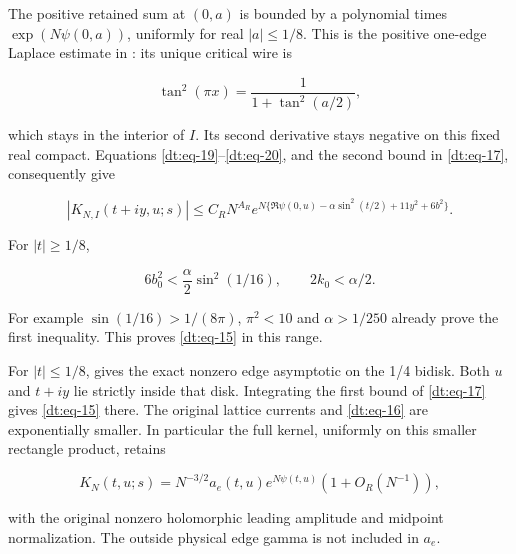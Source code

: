 The positive retained sum at \((0,a)\) is bounded by a polynomial times
\(\exp(N\psi(0,a))\), uniformly for real \(|a|\le1/8\). This is the positive one-edge Laplace estimate in \cite[Section~3]{Summed}: its unique critical wire is

\begin{equation}\label{dt:eq-21}
\tan^2(\pi x)=\frac1{1+\tan^2(a/2)},
\end{equation}

which stays in the interior of \(I\). Its second derivative stays negative
on this fixed real compact. Equations \eqref{dt:eq-19}--\eqref{dt:eq-20}, and the second bound
in \eqref{dt:eq-17}, consequently give

\begin{equation}\label{dt:eq-22}
|K_{N,I}(t+iy,u;s)|\le C_RN^{A_R}
 e^{N\{\Re\psi(0,u)-\alpha\sin^2(t/2)+11y^2+6b^2\}}.
\end{equation}

For \(|t|\ge1/8\),

\begin{equation}\label{dt:eq-23}
6b_0^2<\frac{\alpha}{2}\sin^2(1/16),\qquad
                         2k_0<\alpha/2.
\end{equation}

For example \(\sin(1/16)>1/(8\pi)\), \(\pi^2<10\) and \(\alpha>1/250\) already
prove the first inequality. This proves \eqref{dt:eq-15} in this range.

For \(|t|\le1/8\), \cite[equation~(3.10)]{Summed} gives the exact
nonzero edge asymptotic on the 1/4 bidisk. Both \(u\) and \(t+iy\) lie strictly
inside that disk. Integrating the first bound of \eqref{dt:eq-17} gives \eqref{dt:eq-15} there.
The original lattice currents and \eqref{dt:eq-16} are exponentially smaller.
In particular the full kernel, uniformly on this smaller rectangle
product, retains

\begin{equation}\label{dt:eq-24}
K_N(t,u;s)=N^{-3/2}a_e(t,u)e^{N\psi(t,u)}
                         (1+O_R(N^{-1})),
\end{equation}

with the original nonzero holomorphic leading amplitude and midpoint
normalization. The outside physical edge gamma is not included in \(a_e\).
